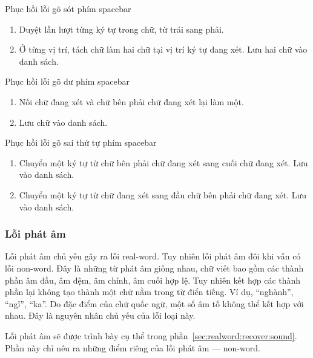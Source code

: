 \documentclass[a4paper,oneside,14pt]{extbook} %
\begin{document}
\begin{algo}\caption{Phục hồi lỗi gõ sót phím spacebar}
  \begin{enumerate}
  \item Duyệt lần lượt từng ký tự trong chữ, từ trái sang phải.
  \item Ở từng vị trí, tách chữ làm hai chữ tại vị trí ký tự đang
    xét. Lưu hai chữ vào danh sách.
  \end{enumerate}
\end{algo}

\begin{algo}\caption{Phục hồi lỗi gõ dư phím spacebar}
  \begin{enumerate}
  \item Nối chữ đang xét và chữ bên phải chữ đang xét lại làm một. 
  \item Lưu chữ vào danh sách.
  \end{enumerate}
\end{algo}

\begin{algo}\caption{Phục hồi lỗi gõ sai thứ tự phím spacebar}
  \begin{enumerate}
  \item Chuyển một ký tự từ chữ bên phải chữ đang xét sang cuối chữ đang
    xét. Lưu vào danh sách.
  \item Chuyển một ký tự từ chữ đang xét sang đầu chữ bên phải chữ đang
    xét. Lưu vào danh sách.
  \end{enumerate}
\end{algo}

\subsubsection{Lỗi phát âm}

Lỗi phát âm chủ yếu gây ra lỗi real-word. Tuy nhiên lỗi phát âm đôi
khi vẫn có lỗi non-word. Đây là những từ phát âm giống nhau, chữ viết
bao gồm các thành phần âm đầu, âm đệm, âm chính, âm cuối hợp lệ. Tuy
nhiên kết hợp các thành phần lại không tạo thành một chữ nằm trong từ
điển tiếng. Ví dụ, ``nghành'', ``ngỉ'', ``ka''. Do đặc điểm của chữ
quốc ngữ, một số âm tố không thể kết hợp với nhau. Đây là nguyên nhân
chủ yếu của lỗi loại này.

Lỗi phát âm sẽ được trình bày cụ thể trong
phần~\ref{sec:realword:recover:sound}. Phần này chỉ nêu ra những điểm
riêng của lỗi phát âm --- non-word.
\end{document}
